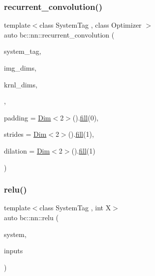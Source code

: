 \mbox{\label{namespacebc_1_1nn_af1f206cd72b05e2745666402f91a5b72}} 
\subsubsection{\texorpdfstring{recurrent\+\_\+convolution()}{recurrent\_convolution()}\hspace{0.1cm}{\footnotesize\ttfamily [2/2]}}
{\footnotesize\ttfamily template$<$class System\+Tag , class Optimizer $>$ \\
auto bc\+::nn\+::recurrent\+\_\+convolution (\begin{DoxyParamCaption}\item[{System\+Tag}]{system\+\_\+tag,  }\item[{\hyperlink{structbc_1_1Dim}{Dim}$<$ 3 $>$}]{img\+\_\+dims,  }\item[{\hyperlink{structbc_1_1Dim}{Dim}$<$ 3 $>$}]{krnl\+\_\+dims,  }\item[{Optimizer}]{,  }\item[{\hyperlink{structbc_1_1Dim}{Dim}$<$ 2 $>$}]{padding = {\ttfamily \hyperlink{structbc_1_1Dim}{Dim}$<$2$>$().\hyperlink{tensor__iteralgos_8h_afd10a40f252abd24d1faa2752becdd53}{fill}(0)},  }\item[{\hyperlink{structbc_1_1Dim}{Dim}$<$ 2 $>$}]{strides = {\ttfamily \hyperlink{structbc_1_1Dim}{Dim}$<$2$>$().\hyperlink{tensor__iteralgos_8h_afd10a40f252abd24d1faa2752becdd53}{fill}(1)},  }\item[{\hyperlink{structbc_1_1Dim}{Dim}$<$ 2 $>$}]{dilation = {\ttfamily \hyperlink{structbc_1_1Dim}{Dim}$<$2$>$().\hyperlink{tensor__iteralgos_8h_afd10a40f252abd24d1faa2752becdd53}{fill}(1)} }\end{DoxyParamCaption})}

\mbox{\label{namespacebc_1_1nn_a6858f92eebf902014b9981cc8859d3c1}} 
\subsubsection{\texorpdfstring{relu()}{relu()}\hspace{0.1cm}{\footnotesize\ttfamily [1/5]}}
{\footnotesize\ttfamily template$<$class System\+Tag , int X$>$ \\
auto bc\+::nn\+::relu (\begin{DoxyParamCaption}\item[{System\+Tag}]{system,  }\item[{\hyperlink{structbc_1_1Dim}{bc\+::\+Dim}$<$ X $>$}]{inputs }\end{DoxyParamCaption})}

